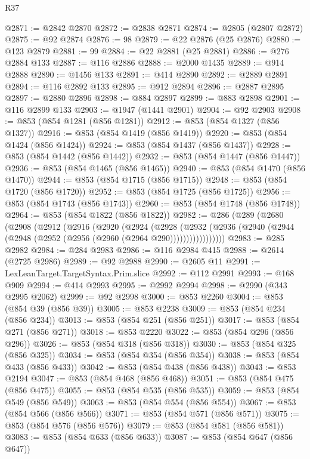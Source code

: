 \begin{lexlean}{R37}
\begin{coremodule}
@2871 := @2842 @2870
@2872 := @2838 @2871
@2874 := @2805 (@2807 @2872)
@2875 := @92 @2874
@2876 := 98
@2879 := @22 @2876 (@25 @2876)
@2880 := @123 @2879
@2881 := 99
@2884 := @22 @2881 (@25 @2881)
@2886 := @276 @2884 @133
@2887 := @116 @2886
@2888 := @2000 @1435
@2889 := @914 @2888
@2890 := @1456 @133
@2891 := @414 @2890
@2892 := @2889 @2891
@2894 := @116 @2892 @133
@2895 := @912 @2894
@2896 := @2887 @2895
@2897 := @2880 @2896
@2898 := @884 @2897
@2899 := @883 @2898
@2901 := @116 @2899 @133
@2903 := @1947 (@1441 @2901)
@2904 := @92 @2903
@2908 := @853 (@854 @1281 (@856 @1281))
@2912 := @853 (@854 @1327 (@856 @1327))
@2916 := @853 (@854 @1419 (@856 @1419))
@2920 := @853 (@854 @1424 (@856 @1424))
@2924 := @853 (@854 @1437 (@856 @1437))
@2928 := @853 (@854 @1442 (@856 @1442))
@2932 := @853 (@854 @1447 (@856 @1447))
@2936 := @853 (@854 @1465 (@856 @1465))
@2940 := @853 (@854 @1470 (@856 @1470))
@2944 := @853 (@854 @1715 (@856 @1715))
@2948 := @853 (@854 @1720 (@856 @1720))
@2952 := @853 (@854 @1725 (@856 @1725))
@2956 := @853 (@854 @1743 (@856 @1743))
@2960 := @853 (@854 @1748 (@856 @1748))
@2964 := @853 (@854 @1822 (@856 @1822))
@2982 := @286
    (@289
      (@2680
        (@2908
          (@2912
            (@2916
              (@2920
                (@2924
                  (@2928
                    (@2932
                      (@2936 (@2940 (@2944 (@2948 (@2952 (@2956 (@2960 (@2964 @290)))))))))))))))))
@2983 := @285 @2982
@2984 := @284 @2983
@2986 := @116 @2984 @415
@2988 := @2614 (@2725 @2986)
@2989 := @92 @2988
@2990 := @2605 @11
@2991 := LexLeanTarget.TargetSyntax.Prim.slice
@2992 := @112 @2991
@2993 := @168 @909
@2994 := @414 @2993
@2995 := @2992 @2994
@2998 := @2990 (@343 @2995 @2062)
@2999 := @92 @2998
@3000 := @853 @2260
@3004 := @853 (@854 @39 (@856 @39))
@3005 := @853 @2238
@3009 := @853 (@854 @234 (@856 @234))
@3013 := @853 (@854 @251 (@856 @251))
@3017 := @853 (@854 @271 (@856 @271))
@3018 := @853 @2220
@3022 := @853 (@854 @296 (@856 @296))
@3026 := @853 (@854 @318 (@856 @318))
@3030 := @853 (@854 @325 (@856 @325))
@3034 := @853 (@854 @354 (@856 @354))
@3038 := @853 (@854 @433 (@856 @433))
@3042 := @853 (@854 @438 (@856 @438))
@3043 := @853 @2194
@3047 := @853 (@854 @468 (@856 @468))
@3051 := @853 (@854 @475 (@856 @475))
@3055 := @853 (@854 @535 (@856 @535))
@3059 := @853 (@854 @549 (@856 @549))
@3063 := @853 (@854 @554 (@856 @554))
@3067 := @853 (@854 @566 (@856 @566))
@3071 := @853 (@854 @571 (@856 @571))
@3075 := @853 (@854 @576 (@856 @576))
@3079 := @853 (@854 @581 (@856 @581))
@3083 := @853 (@854 @633 (@856 @633))
@3087 := @853 (@854 @647 (@856 @647))

\end{coremodule}
\end{lexlean}
